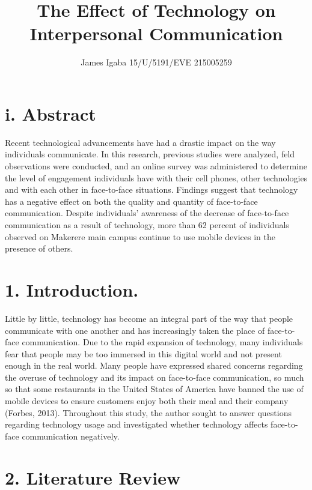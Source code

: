 \documentclass[11pt]{article} %
\title{The Effect of Technology on Interpersonal Communication}
\author{James Igaba 15/U/5191/EVE 215005259}
\begin{document}
\maketitle

\section{i. Abstract }

Recent technological advancements have had a drastic impact on the way individuals communicate. In this research, previous studies were analyzed, feld observations were conducted, and an online survey was administered to determine the level of engagement individuals have with their cell phones, other technologies and with each other in face-to-face situations. Findings suggest that technology has a negative effect on both the quality and quantity of face-to-face communication. Despite individuals’ awareness of the decrease of face-to-face communication as a result of technology, more than 62 percent of individuals observed on Makerere main campus continue to use mobile devices in the presence of others. 

\section{1. Introduction.}

Little by little, technology has become an integral part of the way that people communicate with one 
another and has increasingly taken the place of face-to-face communication. Due to the rapid expansion 
of technology, many individuals fear that people may be too immersed in this digital world and not present 
enough in the real world.
Many people have expressed shared concerns regarding the overuse of technology and its impact on face-to-face 
communication, so much so that some restaurants in the United States of America have banned the use of mobile devices to 
ensure customers enjoy both their meal and their company (Forbes, 2013). Throughout this study, the author 
sought to answer questions regarding technology usage and investigated whether technology affects face-to-face communication negatively. 

\section{2. Literature Review}
\end{document}
